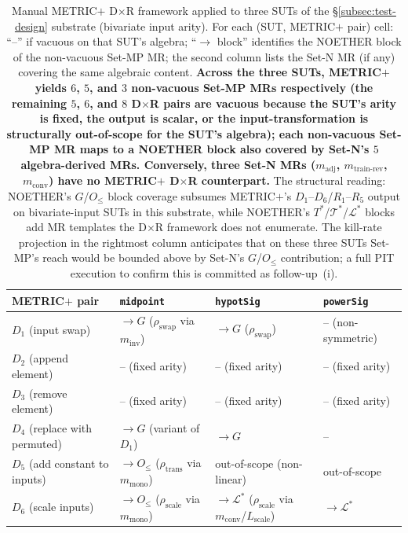 \documentclass[acmsmall, screen]{acmart}
\begin{document}
\begin{table}[h]
\centering
\caption{Manual METRIC$+$ D$\times$R framework applied to three SUTs of
the \S\ref{subsec:test-design} substrate (bivariate input arity). For
each (SUT, METRIC$+$ pair) cell: ``--'' if vacuous on that SUT's
algebra; ``$\to$ block'' identifies the NOETHER block of the
non-vacuous Set-MP MR; the second column lists the Set-N MR (if any)
covering the same algebraic content. \textbf{Across the three SUTs,
METRIC$+$ yields $6$, $5$, and $3$ non-vacuous Set-MP MRs respectively
(the remaining $5$, $6$, and $8$ D$\times$R pairs are vacuous because
the SUT's arity is fixed, the output is scalar, or the
input-transformation is structurally out-of-scope for the SUT's
algebra); each non-vacuous Set-MP MR maps to a NOETHER block also
covered by Set-N's $5$ algebra-derived MRs. Conversely, three Set-N
MRs ($m_{\mathrm{adj}}$, $m_{\mathrm{train\text{-}rev}}$,
$m_{\mathrm{conv}}$) have no METRIC$+$ D$\times$R counterpart.} The structural reading: NOETHER's $G$/$O_{\le}$
block coverage subsumes METRIC$+$'s $D_1$--$D_6$/$R_1$--$R_5$
output on bivariate-input SUTs in this substrate, while NOETHER's
$T^{*}$/$\mathcal{T}^{*}$/$\mathcal{L}^{*}$ blocks add MR templates
the D$\times$R framework does not enumerate. The kill-rate
projection in the rightmost column anticipates that on these three
SUTs Set-MP's reach would be bounded above by Set-N's $G$/$O_{\le}$
contribution; a full PIT execution to confirm this is committed as
follow-up~(i).}
\label{tab:metricplus-headtohead-small}
\footnotesize
\begin{tabular}{l l l l}
\toprule
METRIC$+$ pair & \texttt{midpoint} & \texttt{hypotSig} & \texttt{powerSig} \\
\midrule
$D_1$ (input swap)            & $\to G$ ($\rho_{\mathrm{swap}}$ via $m_{\mathrm{inv}}$) & $\to G$ ($\rho_{\mathrm{swap}}$) & -- (non-symmetric) \\
$D_2$ (append element)        & -- (fixed arity) & -- (fixed arity) & -- (fixed arity) \\
$D_3$ (remove element)        & -- (fixed arity) & -- (fixed arity) & -- (fixed arity) \\
$D_4$ (replace with permuted) & $\to G$ (variant of $D_1$) & $\to G$ & -- \\
$D_5$ (add constant to inputs)& $\to O_{\le}$ ($\rho_{\mathrm{trans}}$ via $m_{\mathrm{mono}}$) & out-of-scope (non-linear) & out-of-scope \\
$D_6$ (scale inputs)          & $\to O_{\le}$ ($\rho_{\mathrm{scale}}$ via $m_{\mathrm{mono}}$) & $\to \mathcal{L}^{*}$ ($\rho_{\mathrm{scale}}$ via $m_{\mathrm{conv}}$/$L_{\mathrm{scale}}$) & $\to \mathcal{L}^{*}$ \\

\end{tabular}
\end{table}
\end{document}
